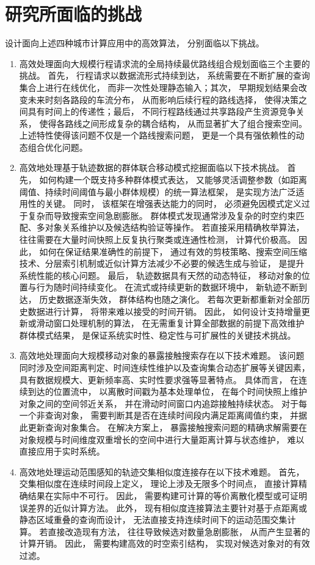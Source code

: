 \section{研究所面临的挑战}
设计面向上述四种城市计算应用中的高效算法， 分别面临以下挑战。
\begin{enumerate}
    \item
    高效处理面向大规模行程请求流的全局持续最优路线组合规划面临三个主要的挑战。 首先， 行程请求以数据流形式持续到达， 系统需要在不断扩展的查询集合上进行在线优化， 而非一次性处理静态输入；其次， 早期规划结果会改变未来时刻各路段的车流分布， 从而影响后续行程的路线选择， 使得决策之间具有时间上的传递性；最后， 不同行程路线通过共享路段产生资源竞争关系， 使得各路线之间形成复杂的耦合结构， 从而显著扩大了组合搜索空间。 上述特性使得该问题不仅是一个路线搜索问题， 更是一个具有强依赖性的动态组合优化问题。

    \item
    高效地处理基于轨迹数据的群体联合移动模式挖掘面临以下技术挑战。 首先， 如何构建一个既支持多种群体模式表达， 又能够灵活调整参数（如距离阈值、持续时间阈值与最小群体规模）的统一算法框架， 是实现方法广泛适用性的关键。 同时， 该框架在增强表达能力的同时， 必须避免因模式定义过于复杂而导致搜索空间急剧膨胀。 群体模式发现通常涉及复杂的时空约束匹配、多对象关系维护以及候选结构验证等操作。 若直接采用精确枚举算法， 往往需要在大量时间快照上反复执行聚类或连通性检测， 计算代价极高。 因此， 如何在保证结果准确性的前提下， 通过有效的剪枝策略、搜索空间压缩技术、分层索引机制或近似计算方法减少不必要的候选生成与验证， 是提升系统性能的核心问题。 最后， 轨迹数据具有天然的动态特征， 移动对象的位置与行为随时间持续变化。 在流式或持续更新的数据环境中， 新轨迹不断到达， 历史数据逐渐失效， 群体结构也随之演化。 若每次更新都重新对全部历史数据进行计算， 将带来难以接受的时间开销。 因此， 如何设计支持增量更新或滑动窗口处理机制的算法， 在无需重复计算全部数据的前提下高效维护群体模式结果， 是保证系统实时性、稳定性与可扩展性的关键技术挑战。

    \item
    高效地处理面向大规模移动对象的暴露接触搜索存在以下技术难题。 该问题同时涉及空间距离判定、时间连续性维护以及查询集合动态扩展等关键因素， 具有数据规模大、更新频率高、实时性要求强等显著特点。 具体而言， 在连续到达的位置流中， 以离散时间戳为基本处理单位， 在每个时间快照上维护对象之间的空间邻近关系， 并在滑动时间窗口内追踪接触持续状态。 对于每一个非查询对象， 需要判断其是否在连续时间段内满足距离阈值约束， 并据此更新查询对象集合。 在解决方案上， 暴露接触搜索问题的精确求解需要在对象规模与时间维度双重增长的空间中进行大量距离计算与状态维护， 难以直接应用于实时系统。

    \item 高效地处理运动范围感知的轨迹交集相似度连接存在以下技术难题。 首先， 交集相似度在连续时间段上定义， 理论上涉及无限多个时间点， 直接计算精确结果在实际中不可行。 因此， 需要构建可计算的等价离散化模型或可证明误差界的近似计算方法。 此外， 现有相似度连接算法主要针对基于点距离或静态区域重叠的查询而设计， 无法直接支持连续时间下的运动范围交集计算。 若直接改造现有方法， 往往导致候选对数量急剧膨胀， 从而产生显著的计算开销。 因此， 需要构建高效的时空索引结构， 实现对候选对象对的有效过滤。
\end{enumerate}


